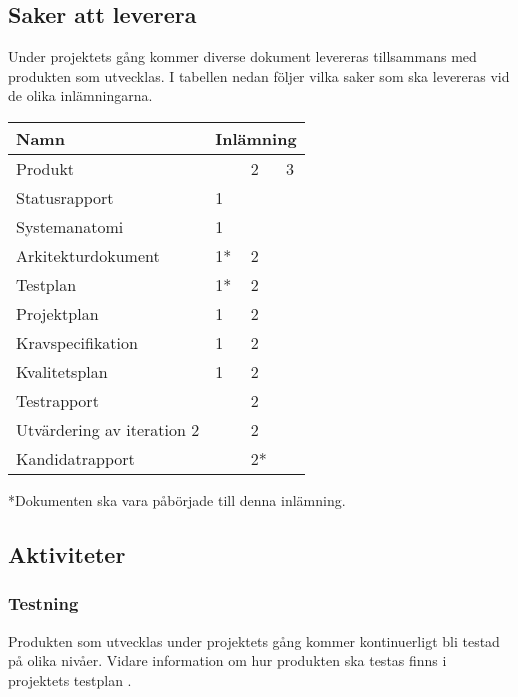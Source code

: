 \subsection{Saker att leverera}
Under projektets gång kommer diverse dokument levereras tillsammans med produkten som utvecklas. I tabellen nedan följer vilka saker som ska levereras vid de olika inlämningarna.

\begin{center}
    \begin{tabular}{| l | l l l |}
        \hline
        \textbf{Namn} & \multicolumn{3}{|c|}{ \textbf{Inlämning} } \\
        \hline
        \centering Produkt & & 2 & 3 \\
        \hline
        \centering Statusrapport & 1 & &\\
        \hline
        \centering Systemanatomi & 1 & &\\
        \hline
        \centering Arkitekturdokument & 1* & 2 &\\
        \hline
        \centering Testplan & 1* & 2 &\\
        \hline
        \centering Projektplan & 1 & 2 &\\
        \hline
        \centering Kravspecifikation & 1 & 2 &\\
        \hline
        \centering Kvalitetsplan & 1 & 2 &\\
        \hline
        \centering Testrapport & & 2 & \\
        \hline
        \centering Utvärdering av iteration 2 & & 2 &\\
        \hline
        \centering Kandidatrapport & & 2* &\\
        \hline
    \end{tabular}
\end{center}

*Dokumenten ska vara påbörjade till denna inlämning.

\subsection{Aktiviteter}

\subsubsection*{Testning}
Produkten som utvecklas under projektets gång kommer kontinuerligt bli testad på olika nivåer. Vidare information om hur produkten ska testas finns i projektets testplan \cite{bib-testplan}.




